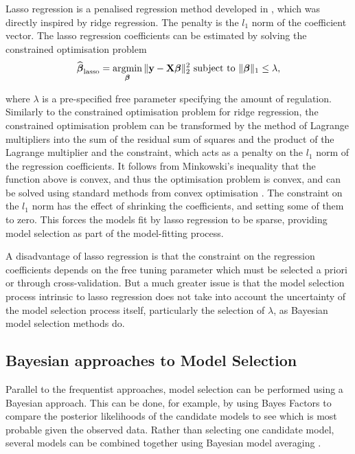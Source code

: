 Lasso regression is a penalised regression method developed in
\cite{Tibshirani1996}, which was directly inspired by ridge regression.  The
penalty is the $l_1$ norm of the coefficient vector.  The lasso regression
coefficients can be estimated by solving the constrained optimisation problem
$$
\widehat{\vbeta}_{\text{lasso}} = \argmin_\vbeta \|\vy - \mX \vbeta\|_2^2 \text{ subject to } \|\vbeta\|_1 \leq \lambda,
$$

\noindent 
where $\lambda$ is a pre-specified free parameter specifying the amount of
regulation. Similarly to the constrained optimisation problem for ridge
regression, the constrained optimisation problem can be transformed by the
method of Lagrange multipliers into the sum of the residual sum of squares and
the product of the Lagrange multiplier and the constraint, which acts as a
penalty on the $l_1$ norm of the regression coefficients. It follows from
Minkowski's inequality that the function above is convex, and thus the
optimisation problem is convex, and can be solved using standard methods from
convex optimisation \citep{Boyd2010}.  The constraint on the $l_1$ norm has the
effect of shrinking the coefficients, and setting some of them to zero. This
forces the models fit by lasso regression to be sparse, providing model
selection as part of the model-fitting process.

A disadvantage of lasso regression is that the constraint on the regression
coefficients depends on the free tuning parameter which must be selected a
priori or through cross-validation. But a much greater issue is that the model
selection process intrinsic to lasso regression does not take into account the
uncertainty of the model selection process itself, particularly the selection of
$\lambda$, as Bayesian model selection methods do.

\subsection{Bayesian approaches to Model Selection}

Parallel to the frequentist approaches, model selection can be performed using
a Bayesian approach. This can be done, for example, by using Bayes Factors  to
compare the posterior likelihoods of the candidate models to see which is most
probable given the observed data\citep{Kass1993}. Rather than selecting one
candidate model, several models can be combined together using Bayesian model
averaging \citep{Hoeting1999, Raftery1997, Fernandez2001,
Papaspiliopoulos2016}.

